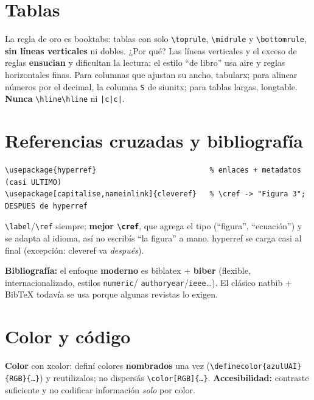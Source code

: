\documentclass[11pt,a4paper]{article}
\newcommand{\C}[1]{\texttt{\textbackslash #1}}
\newcommand{\pkg}[1]{\textsf{#1}}
\begin{document}
\section{Tablas}
La regla de oro es \pkg{booktabs}: tablas con solo \C{toprule}, \C{midrule} y
\C{bottomrule}, \textbf{sin líneas verticales} ni dobles. ¿Por qué? Las líneas
verticales y el exceso de reglas \textbf{ensucian} y dificultan la lectura; el
estilo \enquote{de libro} usa aire y reglas horizontales finas. Para columnas que
ajustan su ancho, \pkg{tabularx}; para alinear números por el decimal, la columna
\texttt{S} de \pkg{siunitx}; para tablas largas, \pkg{longtable}. \textbf{Nunca}
\verb|\hline\hline| ni \verb#|c|c|#.

\section{Referencias cruzadas y bibliografía}
\begin{lstlisting}
\usepackage{hyperref}                          % enlaces + metadatos (casi ULTIMO)
\usepackage[capitalise,nameinlink]{cleveref}   % \cref -> "Figura 3"; DESPUES de hyperref
\end{lstlisting}
\C{label}/\C{ref} siempre; \textbf{mejor \C{cref}}, que agrega el tipo
(\enquote{figura}, \enquote{ecuación}) y se adapta al idioma, así no escribís
\enquote{la figura} a mano. \pkg{hyperref} se carga casi al final (excepción:
\pkg{cleveref} va \emph{después}).

\noindent\textbf{Bibliografía:} el enfoque \textbf{moderno} es \pkg{biblatex} +
\textbf{biber} (flexible, internacionalizado, estilos \texttt{numeric}/
\texttt{authoryear}/\texttt{ieee}\dots). El clásico \pkg{natbib} + BibTeX todavía
se usa porque algunas revistas lo exigen.

\section{Color y código}
\textbf{Color} con \pkg{xcolor}: definí colores \textbf{nombrados} una vez
(\C{definecolor\{azulUAI\}\{RGB\}\{\dots\}}) y reutilizalos; no dispersás
\C{color[RGB]\{\dots\}}. \textbf{Accesibilidad:} contraste suficiente y no
codificar información \emph{solo} por color.
\end{document}

